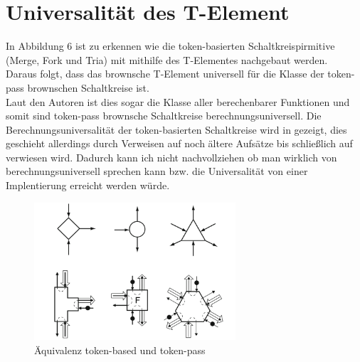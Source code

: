 \documentclass[11pt,a4paper]{article}
\begin{document}
\section{Universalität des T-Element}

In Abbildung 6 ist zu erkennen wie die token-basierten Schaltkreispirmitive 
(Merge, Fork und Tria) mit mithilfe des T-Elementes nachgebaut werden.
%
\\
Daraus folgt, dass das brownsche T-Element universell für die Klasse der 
token-pass brownschen Schaltkreise ist.
\\
%
Laut den Autoren ist dies sogar die Klasse aller berechenbarer Funktionen und
somit sind token-pass brownsche Schaltkreise berechnungsuniversell. 
%
Die Berechnungsuniversalität der token-basierten Schaltkreise wird in
\cite{Lee_2005} gezeigt, dies geschieht allerdings durch Verweisen auf 
noch ältere Aufsätze bis schließlich  auf \cite{Keller_1974} verwiesen wird.
%
Dadurch kann ich nicht nachvollziehen ob man wirklich von berechnungsuniversell
sprechen kann bzw. die Universalität von einer Implentierung erreicht
werden würde. 

\begin{figure}[h]
    \centering
    \includegraphics[width=7.5cm]{bilder/BasedToPass.png}
    \caption{Äquivalenz token-based und token-pass}
    \label{fig:BasedToPass}
\end{figure}


\end{document}
